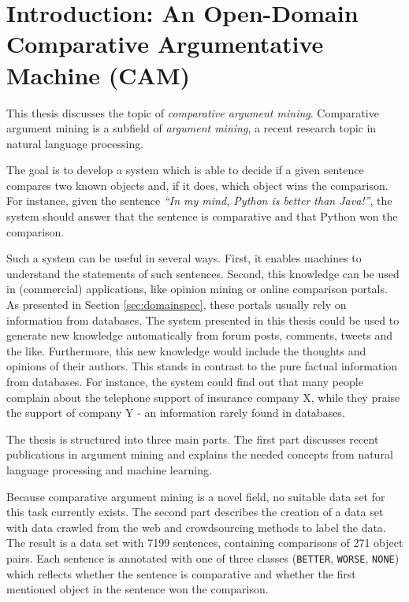 \chapter{Introduction: An Open-Domain Comparative Argumentative Machine (CAM)}
This thesis discusses the topic of \emph{comparative argument mining}. Comparative argument mining is a subfield of \emph{argument mining}, a recent research topic in natural language processing.

The goal is to develop a system which is able to decide if a given sentence compares two known objects and, if it does, which object wins the comparison. For instance, given the sentence \emph{\enquote{In my mind, Python is better than Java!}}, the system should answer that the sentence is comparative and that Python won the comparison.

Such a system can be useful in several ways. First, it enables machines to understand the statements of such sentences. Second, this knowledge can be used in (commercial) applications, like opinion mining or online comparison portals. As presented in Section \ref{sec:domainspec}, these portals usually rely on information from databases. The system presented in this thesis could be used to generate new knowledge automatically from forum posts, comments, tweets and the like. Furthermore, this new knowledge would include the thoughts and opinions of their authors. This stands in contrast to the pure factual information from databases. For instance, the system could find out that many people complain about the telephone support of insurance company X, while they praise the support of company Y - an information rarely found in databases.\newline

The thesis is structured into three main parts. The first part discusses recent publications in argument mining and explains the needed concepts from natural language processing and machine learning.

Because comparative argument mining is a novel field, no suitable data set for this task currently exists. The second part describes the creation of a data set with data crawled from the web and crowdsourcing methods to label the data. The result is a data set with 7199 sentences, containing comparisons of 271 object pairs. Each sentence is annotated with one of three classes (\texttt{BETTER}, \texttt{WORSE}, \texttt{NONE}) which reflects whether the sentence is comparative and whether the first mentioned object in the sentence won the comparison.

